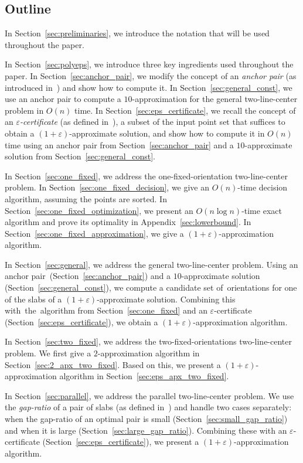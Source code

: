 \documentclass[english,a4paper, cleveref, autoref, thm-restate, nolineno]{socg-lipics-v2021}
\theoremstyle{star}
\theoremstyle{claimstar}
\newcommand{\eps}{\ensuremath{\varepsilon}}
\begin{document}
\newpage
\subsection{Outline}
In Section~\ref{sec:preliminaries}, we introduce the notation that will be used throughout the paper.

In Section~\ref{sec:polyeps}, we introduce three key ingredients used throughout the paper.
In Section~\ref{sec:anchor_pair}, we modify the concept of an \emph{anchor pair} (as introduced in~\cite{agarwalTwo}) and show how to compute it.
In Section~\ref{sec:general_const}, we use an anchor pair to compute a $10$-approximation for the general two-line-center problem in $O(n)$ time.
In Section~\ref{sec:eps_certificate}, we recall the concept of an \emph{$\eps$-certificate} (as defined in~\cite{agarwal2005approximation}), a subset of the input point set that suffices to obtain a $(1+\eps)$-approximate solution, and show how to compute it in $O(n)$ time using an anchor pair from Section~\ref{sec:anchor_pair} and a $10$-approximate solution from Section~\ref{sec:general_const}.

In Section~\ref{sec:one_fixed}, we address the one-fixed-orientation two-line-center problem.
In Section~\ref{sec:one_fixed_decision}, we give an $O(n)$-time decision algorithm, assuming the points are sorted.
In Section~\ref{sec:one_fixed_optimization}, we present an $O(n\log n)$-time exact algorithm and prove its optimality in Appendix~\ref{sec:lowerbound}.
In Section~\ref{sec:one_fixed_approximation}, we give a $(1+\eps)$-approximation algorithm.

In Section~\ref{sec:general}, we address the general two-line-center problem.
Using an anchor pair~(Section~\ref{sec:anchor_pair}) and a $10$-approximate solution (Section~\ref{sec:general_const}), we compute a candidate set of~orientations for one of the slabs of a $(1+\eps)$-approximate solution.
Combining this with~the~algorithm from Section~\ref{sec:one_fixed} and an $\eps$-certificate (Section~\ref{sec:eps_certificate}), we obtain a $(1+\eps)$-approximation algorithm.

In Section~\ref{sec:two_fixed}, we address the two-fixed-orientations two-line-center problem.
We first give a $2$-approximation algorithm in Section~\ref{sec:2_apx_two_fixed}. 
Based on this, we present a $(1+\eps)$-approximation algorithm in Section~\ref{sec:eps_apx_two_fixed}.

In Section~\ref{sec:parallel}, we address the parallel two-line-center problem.
We use the \emph{gap-ratio} of a pair of slabs (as defined in~\cite{chung2025parallel}) and handle two cases separately: when the gap-ratio of an optimal pair is small (Section~\ref{sec:small_gap_ratio}) and when it is large (Section~\ref{sec:large_gap_ratio}).
Combining these with an $\eps$-certificate (Section~\ref{sec:eps_certificate}), we present a $(1+\eps)$-approximation algorithm.
\end{document}
